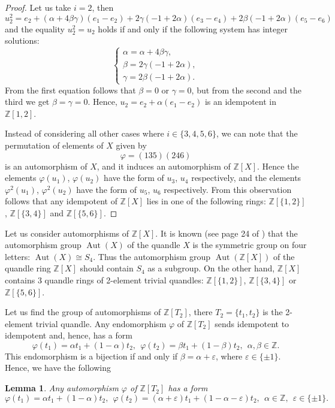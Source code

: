 \documentclass[12pt]{amsart}
\newtheorem{lemma}[thm]{Lemma}
\theoremstyle{definition}
\theoremstyle{remark}
\newcommand{\Z}{\mathbb{Z}}
\def\Aut{\operatorname{Aut}}
\def\a{\alpha}
\def\b{\beta}
\def\g{\gamma}
\begin{document}
\begin{proof}
Let us take $i = 2$, then 
$$
u_2^2 = e_2 + (\a + 4 \b \g) (e_1 - e_2) + 2 \g ( -1 + 2 \a) (e_3 - e_4) + 2 \b (-1 + 2 \a) (e_5 - e_6) 
$$
and the equality $u_2^2 = u_2$ holds if and only if the following system has integer solutions:
$$
\begin{cases}
\a = \a + 4 \b \g,\\
\b = 2  \g (-1 + 2 \a), \\
\g = 2 \b (-1 + 2 \a). 
\end{cases}
$$ 
From the first equation follows that $\b=0$ or $\g = 0$, but from the second and the third we get $\b=\g = 0$. Hence,  $u_2 =  e_2 + \alpha (e_1 - e_2)$ is an idempotent in $\Z[1, 2]$. 

Instead of considering all other cases where $i \in \{ 3, 4, 5, 6 \}$, we can note that the permutation of elements of $X$ given by
$$
\varphi = (1 3 5) (2 4 6)
$$
is an automorphism of $X$, and it induces an automorphism of  $\Z[X]$. Hence the elements $\varphi(u_1)$, $\varphi(u_2)$ have the form of $u_3$,  $u_4$ respectively, and the elements $\varphi^2(u_1)$, $\varphi^2(u_2)$ have the form of $u_5$,  $u_6$ respectively. From this observation follows that any idempotent of $\Z[X]$ lies in one of the following rings: $\Z[\{1, 2\}]$,  $\Z[\{3, 4\}]$ and  $\Z[\{5, 6\}]$. 
\end{proof}


Let us consider  automorphisms of $\Z[X]$. It is known (see page 24 of  \cite{Maq}) that the  automorphism group $\Aut(X)$ of the  quandle $X$ is the symmetric group on four letters: $\Aut(X)\cong S_4$. Thus the automorphism group  $\Aut (\mathbb{Z}[X])$ of the quandle ring $\mathbb{Z}[X]$ should contain $S_4$ as a subgroup. 
On the other hand, $\Z[X]$ contains 3 quandle rings of 2-element trivial quandles: $\Z[\{1, 2\}]$,  $\Z[\{3, 4\}]$ or  $\Z[\{5, 6\}]$.

 Let us find the group of automorphisms of $\Z[T_2]$, there $T_2 = \{ t_1, t_2 \}$ is the 2-element trivial quandle. Any endomorphism $\varphi$ of $\Z[T_2]$ sends idempotent to idempotent and, hence, has a form
$$
\varphi (t_1) = \alpha t_1 + (1 - \alpha) t_2,~~\varphi (t_2) = \beta t_1 + (1 - \beta) t_2,~~\alpha, \beta \in \Z.
$$
This endomorphism is a bijection if and only if $\beta = \alpha + \varepsilon$, where $\varepsilon \in \{ \pm 1 \}$. Hence, we have the following 

\begin{lemma} \label{ATQ}
Any automorphism $\varphi$ of $\Z[T_2]$ has a form
$$
\varphi (t_1) = \alpha t_1 + (1 - \alpha) t_2,~~\varphi (t_2) = (\alpha + \varepsilon) t_1 + (1 - \alpha  -  \varepsilon) t_2,~~\alpha  \in \Z,~~\varepsilon \in \{ \pm 1 \}.
$$
\end{lemma} 
\end{document}
